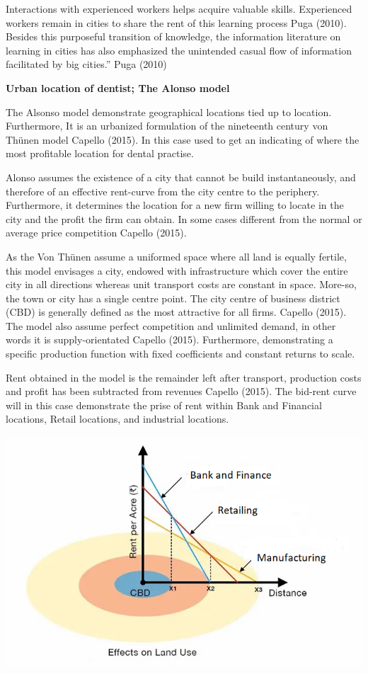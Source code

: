 \documentclass[
  10,
  a4paper,
]{article}
\begin{document}
Interactions with experienced workers helps acquire valuable skills.
Experienced workers remain in cities to share the rent of this learning
process Puga (2010). Besides this purposeful transition of knowledge,
the information literature on learning in cities has also emphasized the
unintended casual flow of information facilitated by big cities.'' Puga
(2010)

\textbf{Urban location of dentist; The Alonso model}

The Alsonso model demonstrate geographical locations tied up to
location. Furthermore, It is an urbanized formulation of the nineteenth
century von Thünen model Capello (2015). In this case used to get an
indicating of where the most profitable location for dental practise.

Alonso assumes the existence of a city that cannot be build
instantaneously, and therefore of an effective rent-curve from the city
centre to the periphery. Furthermore, it determines the location for a
new firm willing to locate in the city and the profit the firm can
obtain. In some cases different from the normal or average price
competition Capello (2015).

As the Von Thünen assume a uniformed space where all land is equally
fertile, this model envisages a city, endowed with infrastructure which
cover the entire city in all directions whereas unit transport costs are
constant in space. More-so, the town or city has a single centre point.
The city centre of business district (CBD) is generally defined as the
most attractive for all firms. Capello (2015). The model also assume
perfect competition and unlimited demand, in other words it is
supply-orientated Capello (2015). Furthermore, demonstrating a specific
production function with fixed coefficients and constant returns to
scale.

Rent obtained in the model is the remainder left after transport,
production costs and profit has been subtracted from revenues Capello
(2015). The bid-rent curve will in this case demonstrate the prise of
rent within Bank and Financial locations, Retail locations, and
industrial locations.

\includegraphics{images/bidrent.gpg.jpg}
\end{document}
